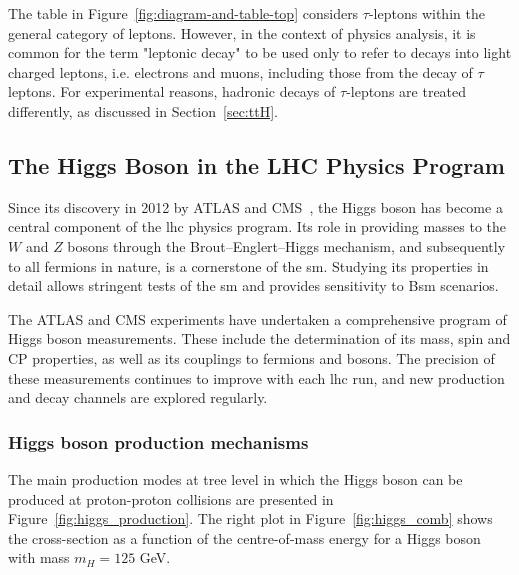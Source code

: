 The table in Figure~\ref{fig:diagram-and-table-top} considers $\tau$-leptons within the general category of leptons. However, in the context of physics analysis, it is common for the term "leptonic decay" to be used only to refer to decays into light charged leptons, i.e. electrons and muons, including those from the decay of $\tau$ leptons. For experimental reasons, hadronic decays of $\tau$-leptons are treated differently, as discussed in Section~\ref{sec:ttH}.

\subsection{The Higgs Boson in the LHC Physics Program}
\label{sec:higgs_program}

Since its discovery in 2012 by ATLAS and CMS~\cite{ATLAS:2012yve,CMS:2012qbp}, the Higgs boson has become a central component of the \acrshort{lhc} physics program. Its role in providing masses to the $W$ and $Z$ bosons through the Brout–Englert–Higgs mechanism, and subsequently to all fermions in nature, is a cornerstone of the \acrshort{sm}. Studying its properties in detail allows stringent tests of the \acrshort{sm} and provides sensitivity to B\acrshort{sm} scenarios.

The ATLAS and CMS experiments have undertaken a comprehensive program of Higgs boson measurements. These include the determination of its mass, spin and CP properties, as well as its couplings to fermions and bosons. The precision of these measurements continues to improve with each \acrshort{lhc} run, and new production and decay channels are explored regularly.

\subsubsection*{Higgs boson production mechanisms}
\label{sec:higgs_production}
The main production modes at tree level in which the Higgs boson can be produced at proton-proton collisions are presented in Figure~\ref{fig:higgs_production}. The right plot in Figure~\ref{fig:higgs_comb} shows the cross-section as a function of the centre-of-mass energy for a Higgs boson with mass $m_{H}=125$ GeV.

